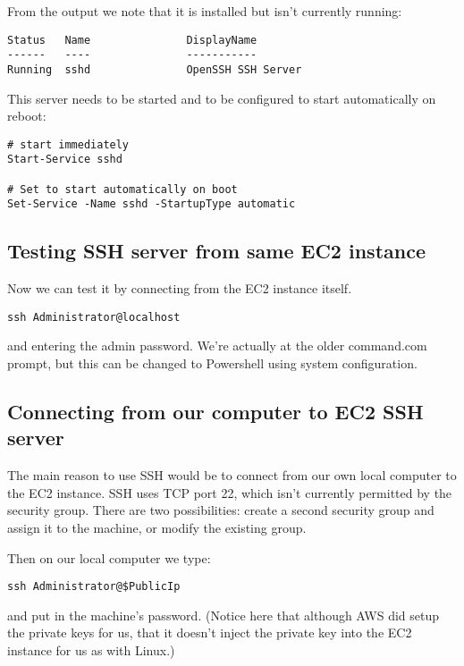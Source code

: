 \documentclass{pgnotes}
\begin{document}
From the output we note that it is installed but isn't currently
running:

\begin{verbatim}
Status   Name               DisplayName
------   ----               -----------
Running  sshd               OpenSSH SSH Server
\end{verbatim}

This server needs to be started and to be configured to start
automatically on reboot:

\begin{verbatim}
# start immediately
Start-Service sshd

# Set to start automatically on boot
Set-Service -Name sshd -StartupType automatic
\end{verbatim}

\subsection{Testing SSH server from same EC2
instance}\label{testing-ssh-server-from-same-ec2-instance}

Now we can test it by connecting from the EC2 instance itself.

\begin{verbatim}
ssh Administrator@localhost
\end{verbatim}

and entering the admin password. We're actually at the older command.com
prompt, but this can be changed to Powershell using system
configuration.

\subsection{Connecting from our computer to EC2 SSH
server}\label{connecting-from-our-computer-to-ec2-ssh-server}

The main reason to use SSH would be to connect from our own local
computer to the EC2 instance. SSH uses TCP port 22, which isn't
currently permitted by the security group. There are two possibilities:
create a second security group and assign it to the machine, or modify
the existing group.


Then on our local computer we type:

\begin{verbatim}
ssh Administrator@$PublicIp
\end{verbatim}

and put in the machine's password. (Notice here that although AWS did
setup the private keys for us, that it doesn't inject the private key
into the EC2 instance for us as with Linux.)
\end{document}
